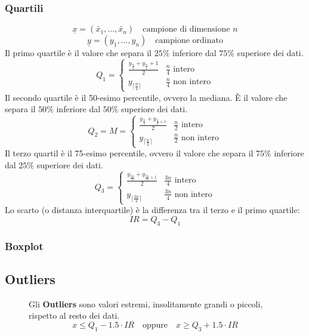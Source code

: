 \documentclass[a4paper]{article}
\theoremstyle{break}
\theoremstyle{break}
\theoremstyle{break}
\theoremstyle{break}
\begin{document}
\subsubsection{Quartili}
\[
	\underline{x} = (\tilde{x_1}, \ldots, \tilde{x_n}) \quad \text{campione di dimensione } n
\]
\[
	\underline{y} = (y_1, \ldots, y_n) \quad \text{campione ordinato}
\]
Il primo quartile è il valore che separa il \( 25\% \) inferiore dal \( 75\% \) superiore
dei dati.
\[
	Q_1 = \begin{cases}
		\frac{y_\frac{n}{4} + y_\frac{n}{4}+1}{2} & \frac{n}{4} \text{  intero}    \\
		y_{\lceil \frac{n}{4} \rceil}             & \frac{n}{4} \text{ non intero}
	\end{cases}
\]
Il secondo quartile è il 50-esimo percentile, ovvero la mediana. È il valore che separa
il \( 50\% \) inferiore dal \( 50\% \) superiore dei dati.
\[
	Q_2 = M = \begin{cases}
		\frac{y_{\frac{n}{2}} + y_{\frac{n}{2}+1}}{2} & \frac{n}{2} \text{  intero}    \\
		y_{\lceil \frac{n}{2} \rceil}                 & \frac{n}{2} \text{ non intero}
	\end{cases}
\]
Il terzo quartil è il 75-esimo percentile, ovvero il valore che separa il \( 75\% \)
inferiore dal \( 25\% \) superiore dei dati.
\[
	Q_3 = \begin{cases}
		\frac{y_{\frac{3n}{4}} + y_{\frac{3n}{4}+1}}{2} & \frac{3n}{4} \text{  intero}    \\
		y_{\lceil \frac{3n}{4} \rceil}                  & \frac{3n}{4} \text{ non intero}
	\end{cases}
\]
Lo scarto (o distanza interquartile) è la differenza tra il terzo e il primo quartile:
\[
	IR = Q_3 - Q_1
\]
\subsubsection{Boxplot}

\subsection{Outliers}
\begin{figure}[H]
	\begin{definition}
		Gli \textbf{Outliers} sono valori estremi, insolitamente grandi o piccoli, rispetto
		al resto dei dati.
		\[
			x \le Q_1 - 1.5 \cdot IR \quad \text{oppure} \quad x \ge Q_3 + 1.5 \cdot IR
		\]
	\end{definition}
\end{figure}
\label{D1}
\end{document}
